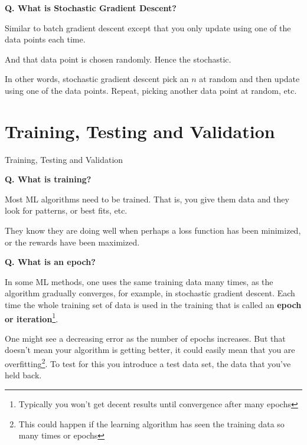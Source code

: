 \begin{frame}[fragile]{\textbf{Q. What is Stochastic Gradient Descent?}}
  \begin{wideitemize}
    \item Similar to batch gradient descent except that you only update
    using one of the data points each time.
    \item And that data point is chosen randomly. Hence the stochastic.
    \item In other words, stochastic gradient descent pick an $n$ at random
    and then update using one of the data points. Repeat, picking another
    data point at random, etc.
  \end{wideitemize}
\end{frame}

\section{Training, Testing and Validation}
\begin{transitionframe}
  \begin{center}
    \Huge Training, Testing and Validation
  \end{center}
\end{transitionframe}


\begin{frame}[fragile]{\textbf{Q. What is training?}}
  \begin{wideitemize}
    \item Most ML algorithms need to be trained. That is, you give
    them data and they look for patterns, or best fits, etc.
    \item They know they are doing well when perhaps a loss function
    has been minimized, or the rewards have been maximized.
  \end{wideitemize}
\end{frame}

\begin{frame}[fragile]{\textbf{Q. What is an epoch?}}
  \begin{wideitemize}
    \item In some ML methods, one uses the same training data many times,
    as the algorithm gradually converges, for example, in stochastic gradient
    descent. Each time the whole training set of data is used in the training
    that is called an \textbf{epoch or iteration}\footnote{Typically you won't
    get decent results until convergence after many epochs}.
    \item One might see a decreasing error as the number of epochs increases.
    But that doesn't mean your algorithm is getting better, it could easily
    mean that you are overfitting\footnote{This could happen if the learning
    algorithm has seen the training data so many times or epochs}. To test for
    this you introduce a test data set, the data that you've held back.
  \end{wideitemize}
\end{frame}

